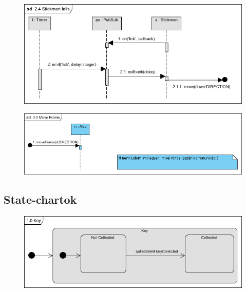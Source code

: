 		\begin{figure}[ht!]
			\begin{center}
				\includegraphics[scale=0.8]{resources/seq_2-4_stickmanFalls.png}
				\caption{}
			\end{center}
		\end{figure}
		
		\begin{figure}[ht!]
			\begin{center}
				\includegraphics[scale=0.8]{resources/seq_3-0_moveFrame.png}
				\caption{}
			\end{center}
		\end{figure}
		
		
	
	\subsection{State-chartok}
	
	\begin{figure}[ht!]
			\begin{center}
				\includegraphics[scale=0.8]{resources/state_1-0_key.png}
				\caption{}
			\end{center}
		\end{figure}
		
